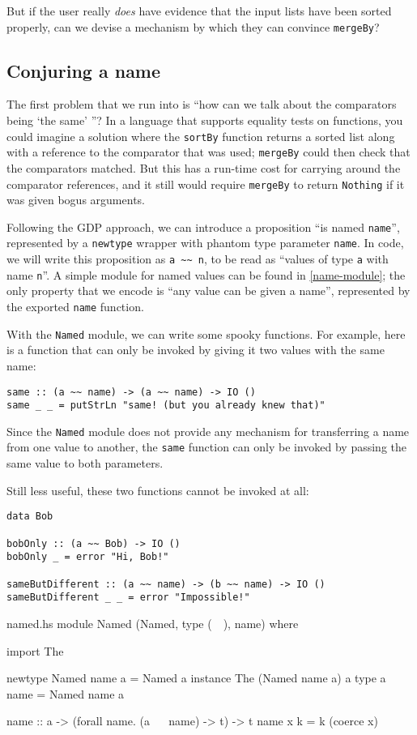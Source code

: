 \documentclass[format=sigplan, review=false, screen=true]{acmart}
\begin{document}
But if the user really \emph{does} have evidence that the input lists have
been sorted properly, can we devise a mechanism by which they can convince
\texttt{mergeBy}?

\subsection{Conjuring a name}
The first problem that we run into is ``how can we talk about the comparators
being `the same' ''? In a language that supports equality tests on functions,
you could imagine a solution where the \texttt{sortBy} function returns a sorted
list along with a reference to the comparator that was used; \texttt{mergeBy} could
then check that the comparators matched. But this has a run-time cost for carrying
around the comparator references, and it still would require \texttt{mergeBy} to
return \texttt{Nothing} if it was given bogus arguments.

Following the GDP approach, we can introduce a proposition ``is named \texttt{name}'',
represented by a \texttt{newtype} wrapper with phantom type parameter \texttt{name}.
In code, we will write this proposition as \verb|a ~~ n|, to be read as
``values of type \texttt{a} with name \texttt{n}''. A simple module for named values
can be found in \cref{name-module}; the only property that we encode is
``any value can be given a name'', represented by the exported \texttt{name} function.

With the \texttt{Named} module, we can write some spooky functions. For example,
here is a function that can only be invoked by giving it two values with the same
name:
\begin{verbatim}
same :: (a ~~ name) -> (a ~~ name) -> IO ()
same _ _ = putStrLn "same! (but you already knew that)"
\end{verbatim}
Since the \texttt{Named} module does not provide any mechanism for transferring
a name from one value to another, the \texttt{same} function can only be invoked
by passing the same value to both parameters.

Still less useful, these two functions cannot be invoked at all:
\begin{verbatim}
data Bob

bobOnly :: (a ~~ Bob) -> IO ()
bobOnly _ = error "Hi, Bob!"

sameButDifferent :: (a ~~ name) -> (b ~~ name) -> IO ()
sameButDifferent _ _ = error "Impossible!"
\end{verbatim}
\begin{filecontents*}{named.hs}
module Named (Named, type (~~), name) where

import The

newtype Named name a = Named a
instance The (Named name a) a
type a ~~ name = Named name a

name :: a -> (forall name. (a ~~ name) -> t) -> t
name x k = k (coerce x)
\end{filecontents*}
\end{document}
